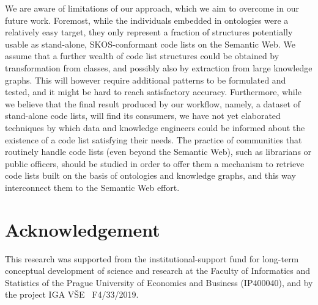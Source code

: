 We are aware of limitations of our approach, which we aim to overcome in our future work.
Foremost, while the individuals embedded in ontologies were a relatively easy target, they only represent a fraction of structures potentially usable as stand-alone, SKOS-conformant code lists on the Semantic Web.
We assume that a further wealth of code list structures could be obtained by transformation from classes, and possibly also by extraction from large knowledge graphs. 
This will however require additional patterns to be formulated and tested, and it might be hard to reach satisfactory accuracy.
Furthermore, while we believe that the final result produced by our workflow, namely, a dataset of stand-alone code lists, will find its consumers, we have not yet elaborated techniques by which data and knowledge engineers could be informed about the existence of a code list satisfying their needs. 
The practice of communities that routinely handle code lists (even beyond the Semantic Web), such as librarians or public officers, should be studied in order to offer them a mechanism to retrieve code lists built on the basis of ontologies and knowledge graphs, and this way interconnect them to the Semantic Web effort.


\section*{Acknowledgement}
This research was supported from the institutional-support fund for long-term conceptual development of science and research at the Faculty of Informatics and Statistics of the Prague University of Economics and Business (IP400040), and by the project IGA V\v{S}E \textnumero\ F4/33/2019.

